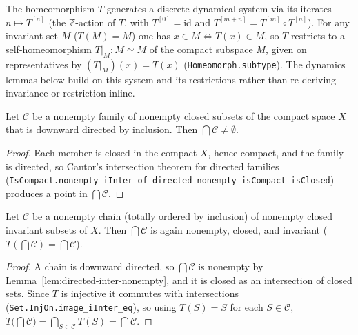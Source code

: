 \begin{definition}
    \label{def:iteration-system}
    \leanok
    The homeomorphism $T$ generates a discrete dynamical system via its iterates
    $n \mapsto T^{[n]}$ (the $\mathbb{Z}$-action of $T$, with
    $T^{[0]} = \mathrm{id}$ and $T^{[m+n]} = T^{[m]} \circ T^{[n]}$). For any
    invariant set $M$ ($T(M) = M$) one has $x \in M \iff T(x) \in M$, so $T$
    restricts to a self-homeomorphism $T|_M : M \simeq M$ of the compact
    subspace $M$, given on representatives by $(T|_M)(x) = T(x)$
    (\texttt{Homeomorph.subtype}). The dynamics lemmas below build on this
    system and its restrictions rather than re-deriving invariance or
    restriction inline.
\end{definition}

\begin{lemma}
    \label{lem:directed-inter-nonempty}
    \leanok
    Let $\mathcal{C}$ be a nonempty family of nonempty closed subsets of the
    compact space $X$ that is downward directed by inclusion. Then
    $\bigcap \mathcal{C} \neq \emptyset$.
\end{lemma}
\begin{proof}
    Each member is closed in the compact $X$, hence compact, and the family is
    directed, so Cantor's intersection theorem for directed families
    (\texttt{IsCompact.nonempty\_iInter\_of\_directed\_nonempty\_isCompact\_isClosed})
    produces a point in $\bigcap \mathcal{C}$.
\end{proof}

\begin{lemma}
    \label{lem:chain-inter-invariant}
    \leanok
    Let $\mathcal{C}$ be a nonempty chain (totally ordered by inclusion) of
    nonempty closed invariant subsets of $X$. Then $\bigcap \mathcal{C}$ is again
    nonempty, closed, and invariant ($T(\bigcap \mathcal{C}) = \bigcap
    \mathcal{C}$).
\end{lemma}
\begin{proof}
    A chain is downward directed, so $\bigcap \mathcal{C}$ is nonempty by
    Lemma~\ref{lem:directed-inter-nonempty}, and it is closed as an intersection
    of closed sets. Since $T$ is injective it commutes with intersections
    (\texttt{Set.InjOn.image\_iInter\_eq}), so using $T(S) = S$ for each
    $S \in \mathcal{C}$,
    $T\bigl(\bigcap \mathcal{C}\bigr) = \bigcap_{S \in \mathcal{C}} T(S)
    = \bigcap \mathcal{C}$.
\end{proof}

